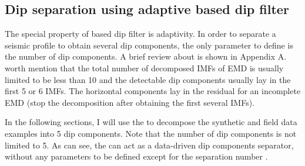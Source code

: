 \subsection{Dip separation using adaptive  based dip filter}
The special property of  based dip filter \cite[]{yangkang2014} is adaptivity. In order to separate a seismic profile to obtain several dip components, the only parameter to define is the number of dip components. A brief review about  is shown in Appendix A.  worth mention that the total number of decomposed  IMFs  of EMD is usually limited to be less than 10 and the detectable dip components usually lay in the first 5 or 6 IMFs. The horizontal components lay in the residual for an incomplete EMD (stop the decomposition after obtaining the first several IMFs).  

In the following sections, I will use the   to decompose the synthetic and field data examples into 5 dip components. Note that the number of dip components is not limited to 5.  As  can see, the  can act as a data-driven dip components separator, without any parameters to be defined except for the separation number . 


